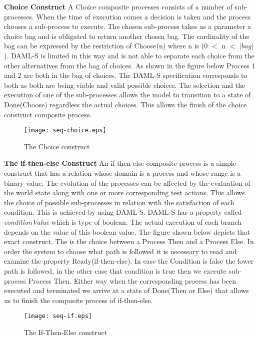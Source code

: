\textbf{Choice Construct} A Choice composite processes consists of a number of sub-processes. When the time of execution comes a decision is taken and the process chooses a sub-process to execute. The chosen sub-process takes as a parameter a choice bag and is obligated to return another chosen bag. The cardinality of the bag can be expressed by the restriction of Choose(n) where n is (0 $<$ n $<$ $|bag|$). DAML-S is limited in this way and is not able to separate each choice from the other alternatives from the bag of choices. As shown in the figure below Process 1 and 2 are both in the bag of choices. The DAML-S specification corresponds to both as both are being viable and valid possible choices. The selection and the execution of one of the sub-processes allows the model to transition to a state of Done(Choose) regardless the actual choices. This allows the finish of the choice construct composite process.
\begin{figure}[h]
    \centering
    \texttt{[image: seq-choice.eps]}
    \caption{The Choice construct}
    \label{fig:Conditional effects and outputs}
\end{figure}
\vspace{1em}

\textbf{The if-then-else Construct} An if-then-else composite process is a simple construct that has a relation whose domain is a process and whose range is a binary value. The evolution of the processes can be affected by the evaluation of the world state along with one or more corresponding test actions. This allows the choice of possible sub-processes in relation with the satisfaction of each condition. This is achieved by using DAML-S. DAML-S has a property called \emph{conditionValue} which is type of boolean. The actual execution of each branch depends on the value of this boolean value. The figure shown below depicts that exact construct. The is the choice between a Process Then and a Process Else. In order the system to choose what path is followed it is necessary to read and examine the property Ready(if-then-else). In case the Condition is false the lower path is followed, in the other case that condition is true then we execute sub-process Process Then. Either way when the corresponding process has been executed and terminated we arrive at a state of Done(Then or Else) that allows us to finish the composite process of if-then-else.
\begin{figure}[h]
    \centering
    \texttt{[image: seq-if.eps]}
    \caption{The If-Then-Else construct}
    \label{fig:Conditional effects and outputs}
\end{figure}
\vspace{1em}

